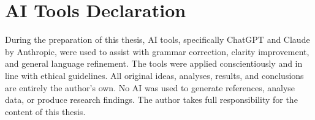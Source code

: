 \chapter*{AI Tools Declaration}
\pagestyle{pre}

During the preparation of this thesis, AI tools, specifically ChatGPT and Claude by
Anthropic, were used to assist with grammar correction, clarity improvement, and general
language refinement. The tools were applied conscientiously and in line with ethical
guidelines. All original ideas, analyses, results, and conclusions are entirely the
author's own. No AI was used to generate references, analyse data, or produce research
findings. The author takes full responsibility for the content of this thesis.
